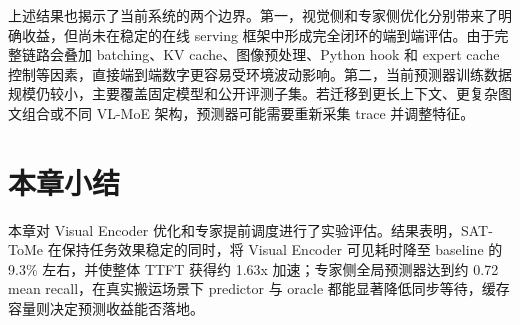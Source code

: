 上述结果也揭示了当前系统的两个边界。第一，视觉侧和专家侧优化分别带来了明确收益，但尚未在稳定的在线 serving 框架中形成完全闭环的端到端评估。由于完整链路会叠加 batching、KV cache、图像预处理、Python hook 和 expert cache 控制等因素，直接端到端数字更容易受环境波动影响。第二，当前预测器训练数据规模仍较小，主要覆盖固定模型和公开评测子集。若迁移到更长上下文、更复杂图文组合或不同 VL-MoE 架构，预测器可能需要重新采集 trace 并调整特征。

\section{本章小结}
本章对 Visual Encoder 优化和专家提前调度进行了实验评估。结果表明，SAT-ToMe 在保持任务效果稳定的同时，将 Visual Encoder 可见耗时降至 baseline 的 9.3\% 左右，并使整体 TTFT 获得约 1.63x 加速；专家侧全局预测器达到约 0.72 mean recall，在真实搬运场景下 predictor 与 oracle 都能显著降低同步等待，缓存容量则决定预测收益能否落地。
